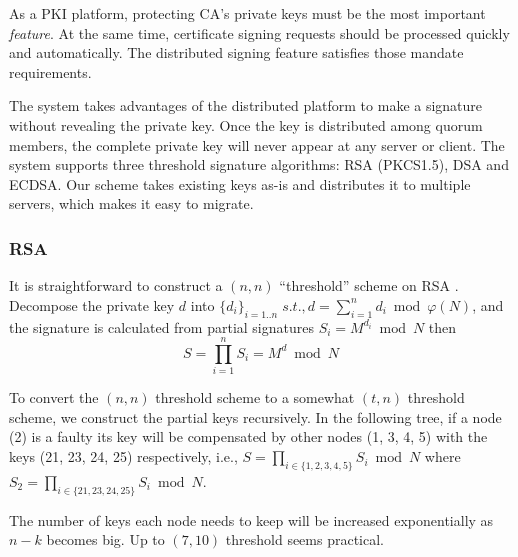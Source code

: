 As a PKI platform, protecting CA's private keys must be the most
important {\em feature}. At the same time, certificate signing
requests should be processed quickly and automatically. The
distributed signing feature satisfies those mandate requirements.

The system takes advantages of the distributed platform to make a
signature without revealing the private key. Once the key is
distributed among quorum members, the complete private key will never
appear at any server or client. The system supports three threshold
signature algorithms: RSA (PKCS1.5), DSA and ECDSA. Our scheme takes
existing keys as-is and distributes it to multiple servers, which
makes it easy to migrate.

\subsubsection*{RSA}
It is straightforward to construct a $(n, n)$ ``threshold'' scheme on
RSA \cite{garay,rabin}. Decompose the private key $d$ into $\{d_i\}_{i =
1..n} \; s.t., d = \sum_{i=1}^{n} d_i \bmod \varphi(N)$, and the
signature is calculated from partial signatures $S_i = M^{d_i} \bmod
N$ then
\[
  S = \prod_{i=1}^{n} S_i = M^d \bmod N
\]

To convert the $(n, n)$ threshold scheme to a somewhat $(t, n)$
threshold scheme, we construct the partial keys recursively. In the
following tree, if a node (2) is a faulty its key will be compensated
by other nodes (1, 3, 4, 5) with the keys (21, 23, 24, 25)
respectively, i.e., $S = \prod_{i \in \{1,2,3,4,5\}} S_i \bmod N$
where $S_2 = \prod_{i \in \{21,23,24,25\}} S_i \bmod N$.


The number of keys each node needs to keep will be increased
exponentially as $n - k$ becomes big. Up to $(7,10)$ threshold seems
practical.

